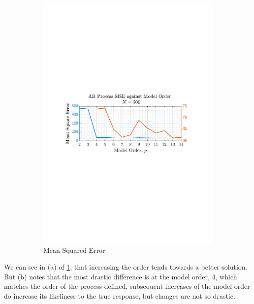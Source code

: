 \documentclass[12pt]{article}
\begin{document}
\begin{figure}[H]
		\begin{subfigure}{0.49\textwidth}
			\centering
			\includegraphics[trim={2.2cm 11.2cm 3.15cm  11.2cm}, clip, width=\textwidth]{../MATLAB/figures/q1_4b_fig16.pdf} 
			\captionsetup{justification=centering}
			\caption{Mean Squared Error}
		\end{subfigure}
		\captionsetup{justification=centering}
		\caption{}
		\label{fig: 1-4b}
	\end{figure}

	We can see in (a) of \ref{fig: 1-4b}, that increasing the order tends towards a better solution. But (b) notes that the most drastic difference is at the model order, 4, which matches the order of the process defined, subsequent increases of the model order do increase its likeliness to the true response, but changes are not so drastic.
	
\end{document}
